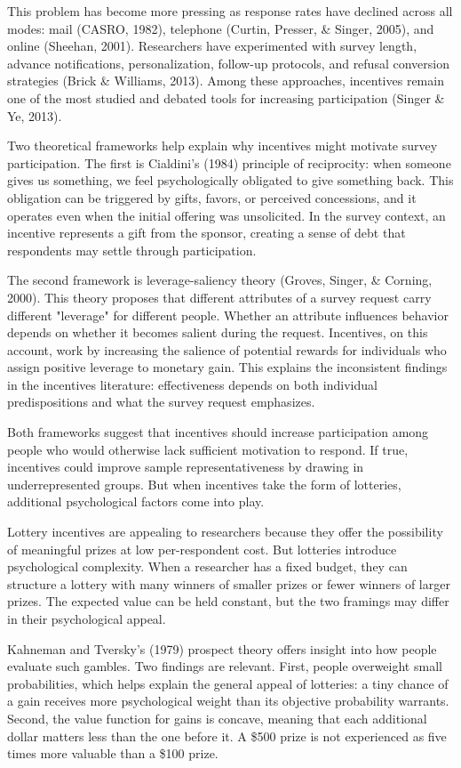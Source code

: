 \documentclass[12pt]{article}
\begin{document}
This problem has become more pressing as response rates have declined across all modes: mail (CASRO, 1982), telephone (Curtin, Presser, \& Singer, 2005), and online (Sheehan, 2001). Researchers have experimented with survey length, advance notifications, personalization, follow-up protocols, and refusal conversion strategies (Brick \& Williams, 2013). Among these approaches, incentives remain one of the most studied and debated tools for increasing participation (Singer \& Ye, 2013).

Two theoretical frameworks help explain why incentives might motivate survey participation. The first is Cialdini's (1984) principle of reciprocity: when someone gives us something, we feel psychologically obligated to give something back. This obligation can be triggered by gifts, favors, or perceived concessions, and it operates even when the initial offering was unsolicited. In the survey context, an incentive represents a gift from the sponsor, creating a sense of debt that respondents may settle through participation.

The second framework is leverage-saliency theory (Groves, Singer, \& Corning, 2000). This theory proposes that different attributes of a survey request carry different "leverage" for different people. Whether an attribute influences behavior depends on whether it becomes salient during the request. Incentives, on this account, work by increasing the salience of potential rewards for individuals who assign positive leverage to monetary gain. This explains the inconsistent findings in the incentives literature: effectiveness depends on both individual predispositions and what the survey request emphasizes.

Both frameworks suggest that incentives should increase participation among people who would otherwise lack sufficient motivation to respond. If true, incentives could improve sample representativeness by drawing in underrepresented groups. But when incentives take the form of lotteries, additional psychological factors come into play.

Lottery incentives are appealing to researchers because they offer the possibility of meaningful prizes at low per-respondent cost. But lotteries introduce psychological complexity. When a researcher has a fixed budget, they can structure a lottery with many winners of smaller prizes or fewer winners of larger prizes. The expected value can be held constant, but the two framings may differ in their psychological appeal.

Kahneman and Tversky's (1979) prospect theory offers insight into how people evaluate such gambles. Two findings are relevant. First, people overweight small probabilities, which helps explain the general appeal of lotteries: a tiny chance of a gain receives more psychological weight than its objective probability warrants. Second, the value function for gains is concave, meaning that each additional dollar matters less than the one before it. A \$500 prize is not experienced as five times more valuable than a \$100 prize.
\end{document}
